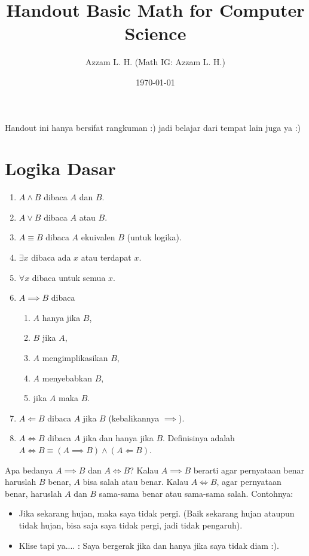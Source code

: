 \documentclass[11pt]{scrartcl}
\begin{document}
	\title{Handout Basic Math for Computer Science} %
	\date{\today}
	\author{Azzam L. H. (Math IG: Azzam L. H.)}
	\maketitle
	Handout ini hanya bersifat rangkuman :) jadi belajar dari tempat lain juga ya :)
    \section{Logika Dasar}
    	\begin{enumerate}
    	    \item $A \land B$ dibaca $A$ dan $B$.
    	    \item $A \lor B$ dibaca $A$ atau $B$.
    	    \item $A \equiv B$ dibaca $A$ ekuivalen $B$ (untuk logika).
    	    \item $\exists x$ dibaca ada $x$ atau terdapat $x$.
    	    \item $\forall x$ dibaca untuk semua $x$.
    	    \item $A \implies B$ dibaca
    	    \begin{enumerate}
    	        \item $A$ hanya jika $B$,
    	        \item $B$ jika $A$,
    	        \item $A$ mengimplikasikan $B$,
    	        \item $A$ menyebabkan $B$,
    	        \item jika $A$ maka $B$.
    	    \end{enumerate}
    	    \item $A \Longleftarrow B$ dibaca $A$ jika $B$ (kebalikannya $\implies$).
    	    \item $A \iff B$ dibaca $A$ jika dan hanya jika $B$. Definisinya adalah $A \iff B \equiv (A \implies B) \land (A \Longleftarrow B)$.
    	\end{enumerate}
    	Apa bedanya $A \implies B$ dan $A \iff B$? Kalau $A \implies B$ berarti agar pernyataan benar haruslah $B$ benar, $A$ bisa salah atau benar. Kalau $A \iff B$, agar pernyataan benar, haruslah $A$ dan $B$ sama-sama benar atau sama-sama salah. Contohnya:
    	\begin{itemize}
    	    \item Jika sekarang hujan, maka saya tidak pergi. (Baik sekarang hujan ataupun tidak hujan, bisa saja saya tidak pergi, jadi tidak pengaruh).
    	    \item Klise tapi ya.... : Saya bergerak jika dan hanya jika saya tidak diam :).
    	\end{itemize}
\end{document}
